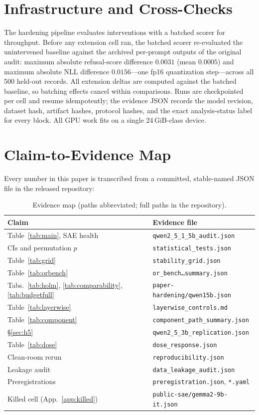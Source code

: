 \documentclass[11pt]{article}
\begin{document}
\section{Infrastructure and Cross-Checks}
\label{app:infra}

The hardening pipeline evaluates interventions with a batched scorer for
throughput.  Before any extension cell ran, the batched scorer re-evaluated
the unintervened baseline against the archived per-prompt outputs of the
original audit: maximum absolute refusal-score difference $0.0031$ (mean
$0.0005$) and maximum absolute NLL difference $0.0156$---one fp16
quantization step---across all 500 held-out records.  All extension deltas
are computed against the batched baseline, so batching effects cancel within
comparisons.  Runs are checkpointed per cell and resume idempotently; the
evidence JSON records the model revision, dataset hash, artifact hashes,
protocol hashes, and the exact analysis-status label for every block.  All
GPU work fits on a single 24\,GiB-class device.

\section{Claim-to-Evidence Map}
\label{app:evidence}

Every number in this paper is transcribed from a committed, stable-named JSON
file in the released repository:

\begin{table}[h]
\centering
\scriptsize
\setlength{\tabcolsep}{4pt}
\begin{tabular}{@{}ll@{}}
\toprule
Claim & Evidence file \\
\midrule
Table~\ref{tab:main}, SAE health & \texttt{qwen2\_5\_1\_5b\_audit.json} \\
CIs and permutation $p$ & \texttt{statistical\_tests.json} \\
Table~\ref{tab:grid} & \texttt{stability\_grid.json} \\
Table~\ref{tab:orbench} & \texttt{or\_bench\ldots summary.json} \\
Tabs.~\ref{tab:holm}, \ref{tab:comparability}, \ref{tab:budgetfull} & \texttt{paper-hardening/qwen15b.json} \\
Table~\ref{tab:layerwise} & \texttt{layerwise\_controls.md} \\
Table~\ref{tab:component} & \texttt{component\_path\_summary.json} \\
\S\ref{sec:h5} & \texttt{qwen2\_5\_3b\_replication.json} \\
Table~\ref{tab:dose} & \texttt{dose\_response.json} \\
Clean-room rerun & \texttt{reproducibility.json} \\
Leakage audit & \texttt{data\_leakage\_audit.json} \\
Preregistrations & \texttt{preregistration.json}, \texttt{*.yaml} \\
Killed cell (App.~\ref{app:killed}) & \texttt{public-sae/gemma2-9b-it.json} \\
\bottomrule
\end{tabular}
\caption{Evidence map (paths abbreviated; full paths in the repository).}
\label{tab:evidence}
\end{table}
\end{document}
